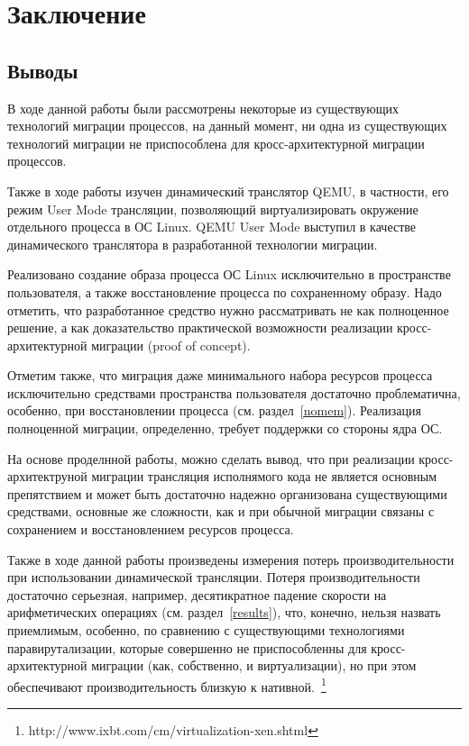 \chapter{Заключение}

\section{Выводы}

В ходе данной работы были рассмотрены некоторые из существующих технологий миграции процессов, на данный момент, ни одна из существующих технологий миграции не приспособлена для кросс-архитектурной миграции процессов.

Также в ходе работы изучен динамический транслятор QEMU, в частности, его режим User Mode трансляции, позволяющий виртуализировать окружение отдельного процесса в ОС Linux. QEMU User Mode выступил в качестве динамического транслятора в разработанной технологии миграции.

Реализовано создание образа процесса ОС Linux исключительно в пространстве пользователя, а также восстановление процесса по сохраненному образу. Надо отметить, что разработанное средство нужно рассматривать не как полноценное решение, а как доказательство практической возможности реализации кросс-архитектурной миграции (proof of concept).

Отметим также, что миграция даже минимального набора ресурсов процесса исключительно средствами пространства пользователя достаточно проблематична, особенно, при восстановлении процесса (см. раздел~\ref{nomem}). Реализация полноценной миграции, определенно, требует поддержки со стороны ядра ОС.

На основе проделнной работы, можно сделать вывод, что при реализации кросс-архитектруной миграции трансляция исполнямого кода не является основным препятствием и может быть достаточно надежно организована существующими средствами, основные же сложности, как и при обычной миграции связаны с сохранением и восстановлением ресурсов процесса.

Также в ходе данной работы произведены измерения потерь производительности при использовании динамической трансляции. Потеря производительности достаточно серьезная, например, десятикратное падение скорости на арифметических операциях (см. раздел~\ref{results}), что, конечно, нельзя назвать приемлимым, особенно, по сравнению с существующими технологиями паравирутализации, которые совершенно не приспособленны для кросс-архитектурной миграции (как, собственно, и виртуализации), но при этом обеспечивают производительность близкую к нативной.~\footnote{http://www.ixbt.com/cm/virtualization-xen.shtml}

